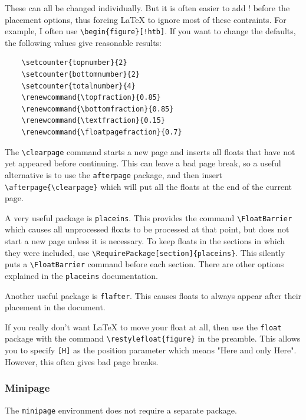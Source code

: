 \documentclass[main_brownies.tex]{subfiles}
\begin{document}
These can all be changed individually. But it is often easier to add ! before the placement options, thus forcing LaTeX to ignore most of these contraints. For example, I often use \verb*|\begin{figure}[!htb]|. If you want to change the defaults, the following values give reasonable results:
\begin{verbatim}
	\setcounter{topnumber}{2}
	\setcounter{bottomnumber}{2}
	\setcounter{totalnumber}{4}
	\renewcommand{\topfraction}{0.85}
	\renewcommand{\bottomfraction}{0.85}
	\renewcommand{\textfraction}{0.15}
	\renewcommand{\floatpagefraction}{0.7}
\end{verbatim}
The \verb*|\clearpage| command starts a new page and inserts all floats that have not yet appeared before continuing. This can leave a bad page break, so a useful alternative is to use the \verb*|afterpage| package, and then insert \verb*|\afterpage{\clearpage}| which will put all the floats at the end of the current page.

A very useful package is \verb*|placeins|. This provides the command \verb*|\FloatBarrier| which causes all unprocessed floats to be processed at that point, but does not start a new page unless it is necessary. To keep floats in the sections in which they were included, use \verb*|\RequirePackage[section]{placeins}|. This silently puts a \verb*|\FloatBarrier| command before each section. There are other options explained in the \verb*|placeins| documentation.
		
Another useful package is \verb*|flafter|. This causes floats to always appear after their placement in the document.
		
If you really don’t want LaTeX to move your float at all, then use the \verb*|float| package with the command \verb*|\restylefloat{figure}| in the preamble. This allows you to specify \verb*|[H]| as the position parameter which means "Here and only Here". However, this often gives bad page breaks.\\

\noindent\dotfill

\subsubsection{Minipage}
The \verb*|minipage| environment does not require a separate package.
\end{document}
